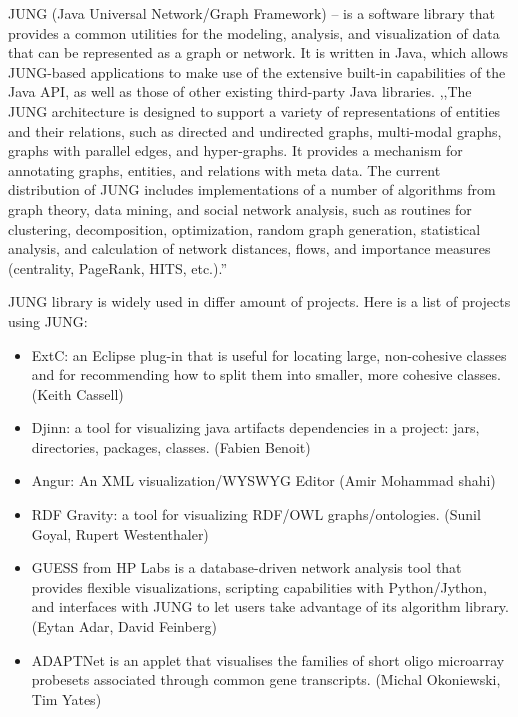 \begin{enumerate}
JUNG (Java Universal Network/Graph Framework) -- is a software library that provides a common utilities for the modeling, analysis, and visualization of data that can be represented as a graph or network. It is written in Java, which allows JUNG-based applications to make use of the extensive built-in capabilities of the Java API, as well as those of other existing third-party Java libraries. ,,The JUNG architecture is designed to support a variety of representations of entities and their relations, such as directed and undirected graphs, multi-modal graphs, graphs with parallel edges, and hyper-graphs. It provides a mechanism for annotating graphs, entities, and relations with meta data. The current distribution of JUNG includes implementations of a number of algorithms from graph theory, data mining, and social network analysis, such as routines for clustering, decomposition, optimization, random graph generation, statistical analysis, and calculation of network distances, flows, and importance measures (centrality, PageRank, HITS, etc.).''~\cite{JUNG_OVERVIEW}


JUNG library is widely used in differ amount of projects. Here is a list of projects using JUNG:

\begin{itemize}

\item ExtC: an Eclipse plug-in that is useful for locating large, non-cohesive classes and for recommending how to split them into smaller, more cohesive classes. (Keith Cassell)~\cite{EXTC}

\item Djinn: a tool for visualizing java artifacts dependencies in a project: jars, directories, packages, classes. (Fabien Benoit)~\cite{DJINN}

\item Angur: An XML visualization/WYSWYG Editor (Amir Mohammad shahi)~\cite{ANGUR}

\item RDF Gravity: a tool for visualizing RDF/OWL graphs/ontologies. (Sunil Goyal, Rupert Westenthaler)~\cite{RDF_GRAVITY}

\item GUESS from HP Labs is a database-driven network analysis tool that provides flexible visualizations, scripting capabilities with Python/Jython, and interfaces with JUNG to let users take advantage of its algorithm library. (Eytan Adar, David Feinberg)~\cite{GUESS}

\item ADAPTNet is an applet that visualises the families of short oligo microarray probesets associated through common gene transcripts. (Michal Okoniewski, Tim Yates)~\cite{ADAPTNET}


\end{itemize}
\end{enumerate}
